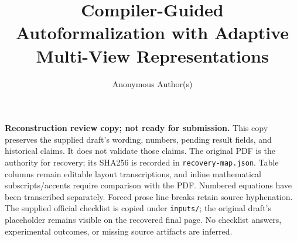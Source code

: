 \documentclass{article}
\title{Compiler-Guided Autoformalization with Adaptive\\Multi-View Representations}
\author{Anonymous Author(s)}
\begin{document}
\maketitle
\noindent\textbf{Reconstruction review copy; not ready for submission.}
This copy preserves the supplied draft's wording, numbers, pending result fields,
and historical claims. It does not validate those claims. The original PDF is the
authority for recovery; its SHA256 is recorded in \texttt{recovery-map.json}.
Table columns remain editable layout transcriptions, and inline mathematical
subscripts/accents require comparison with the PDF. Numbered equations have been
transcribed separately. Forced prose line breaks retain source hyphenation.
The supplied official checklist is copied under \texttt{inputs/}; the original
draft's placeholder remains visible on the recovered final page. No checklist
answers, experimental outcomes, or missing source artifacts are inferred.
\par\medskip









\clearpage

\clearpage
















\clearpage

\end{document}
